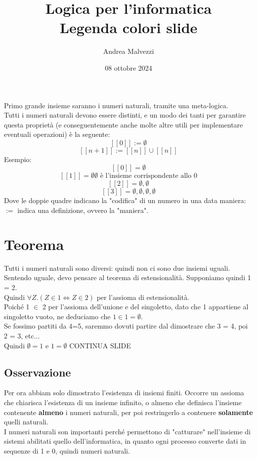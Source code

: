 \documentclass[12pt]{article}
\title{\textbf{Logica per l'informatica\\Legenda colori slide}}
\date{08 ottobre 2024}
\author{Andrea Malvezzi}
\begin{document}
\maketitle
\pagebreak
\tableofcontents
\pagebreak
Primo grande insieme saranno i numeri naturali, tramite una meta-logica.\\
Tutti i numeri naturali devono essere distinti, e un modo dei tanti per garantire questa proprietà (e conseguentemente anche molte altre utili per implementare eventuali operazioni) è la seguente:
\[ [[0]] := \emptyset \]
\[ [[n + 1]] := [[n]] \cup {[[n]]} \]
Esempio:
\[ [[0]] = \emptyset \]
\[ [[1]] = {\emptyset} \text{$\emptyset$ è l'insieme corrispondente allo 0} \]
\[ [[2]] = {\emptyset, {\emptyset}} \]
\[ [[3]] = {\emptyset, {\emptyset}}, {\emptyset, {\emptyset}} \]
Dove le doppie quadre indicano la "codifica" di un numero in una data maniera: $:=$ indica una definizione, ovvero la "maniera".

\section{Teorema}
Tutti i numeri naturali sono diversi: quindi non ci sono due insiemi uguali.\\
Sentendo uguale, devo pensare al teorema di estensionalità. Supponiamo quindi 1 = 2.\\
Quindi $\forall Z. (Z \in 1 \Leftrightarrow Z \in 2)$ per l'assioma di estensionalità.\\
Poiché 1 $\in$ 2 per l'assioma dell'unione e del singoletto, dato che 1 appartiene al singoletto vuoto, ne deduciamo che $1 \in 1 = \emptyset$.\\
Se fossimo partiti da 4=5, saremmo dovuti partire dal dimostrare che 3 = 4, poi 2 = 3, etc...\\
Quindi ${\emptyset} = 1 \text{ e } 1 = \emptyset$ CONTINUA SLIDE
\subsection{Osservazione}
Per ora abbiam solo dimostrato l'esistenza di insiemi finiti. Occorre un assioma che chiarisca l'esistenza di un insieme infinito, o almeno che definisca l'insieme contenente \textbf{almeno} i numeri naturali, per poi restringerlo a contenere \textbf{solamente} quelli naturali.\\
I numeri naturali son importanti perché permettono di "catturare" nell'insieme di sistemi abilitati quello dell'informatica, in quanto ogni processo converte dati in sequenze di 1 e 0, quindi numeri naturali.\\
\end{document}
